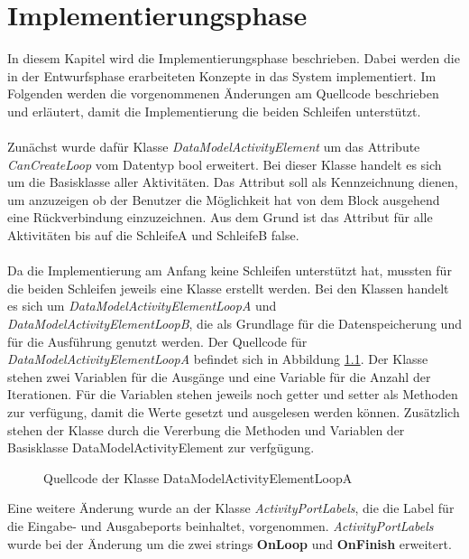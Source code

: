     \chapter{Implementierungsphase}
    In diesem Kapitel wird die Implementierungsphase beschrieben. 
    Dabei werden die in der Entwurfsphase erarbeiteten Konzepte in das System implementiert. \cite{24}
    Im Folgenden werden die vorgenommenen Änderungen am Quellcode beschrieben und erläutert, damit die Implementierung die beiden Schleifen unterstützt.\\
    \\
    Zunächst wurde dafür Klasse \textit{DataModelActivityElement} um das Attribute \textit{CanCreateLoop} vom Datentyp bool erweitert. 
    Bei dieser Klasse handelt es sich um die Basisklasse aller Aktivitäten.
    Das Attribut soll als Kennzeichnung dienen, um anzuzeigen ob der Benutzer die Möglichkeit hat von dem Block ausgehend eine Rückverbindung einzuzeichnen. 
    Aus dem Grund ist das Attribut für alle Aktivitäten bis auf die SchleifeA und SchleifeB false.\\
    \\
    Da die Implementierung am Anfang keine Schleifen unterstützt hat, mussten für die beiden Schleifen jeweils eine Klasse erstellt werden.
    Bei den Klassen handelt es sich um \textit{DataModelActivityElementLoopA} und \textit{DataModelActivityElementLoopB}, die als Grundlage für die Datenspeicherung und für die Ausführung genutzt werden.
    Der Quellcode für \textit{DataModelActivityElementLoopA} befindet sich in Abbildung \cref{cod:datamodelactivityelementloopa}.
    Der Klasse stehen zwei Variablen für die Ausgänge und eine Variable für die Anzahl der Iterationen. 
    Für die Variablen stehen jeweils noch getter und setter als Methoden zur verfügung, damit die Werte gesetzt und ausgelesen werden können.
    Zusätzlich stehen der Klasse durch die Vererbung die Methoden und Variablen der Basisklasse DataModelActivityElement zur verfgügung.
    \begin{figure}[H]
        \centering
                
        \caption{Quellcode der Klasse DataModelActivityElementLoopA}
        \label{cod:datamodelactivityelementloopa}
    \end{figure} 
    Eine weitere Änderung wurde an der Klasse \textit{ActivityPortLabels}, die die Label für die Eingabe- und Ausgabeports beinhaltet, vorgenommen. 
    \textit{ActivityPortLabels} wurde bei der Änderung um die zwei strings \textbf{OnLoop} und \textbf{OnFinish} erweitert.
